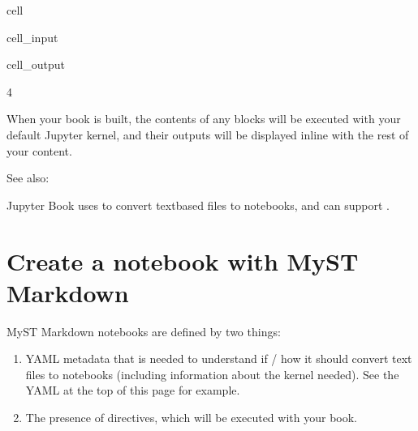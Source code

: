 \documentclass[letterpaper,10pt,english]{jupyterBook}
\begin{document}
\begin{sphinxuseclass}{cell}\begin{sphinxVerbatimInput}

\begin{sphinxuseclass}{cell_input}
\begin{sphinxVerbatim}[commandchars=\\\{\}]
  
\end{sphinxVerbatim}

\end{sphinxuseclass}\end{sphinxVerbatimInput}
\begin{sphinxVerbatimOutput}

\begin{sphinxuseclass}{cell_output}
\begin{sphinxVerbatim}[commandchars=\\\{\}]
4
\end{sphinxVerbatim}

\end{sphinxuseclass}\end{sphinxVerbatimOutput}

\end{sphinxuseclass}
\sphinxAtStartPar
When your book is built, the contents of any  blocks will be
executed with your default Jupyter kernel, and their outputs will be displayed
in\sphinxhyphen{}line with the rest of your content.


\begin{sphinxseealso}{See also:}

\sphinxAtStartPar
Jupyter Book uses  to convert text\sphinxhyphen{}based files to notebooks, and can support .


\end{sphinxseealso}



\section{Create a notebook with MyST Markdown}
\label{\detokenize{markdown-notebooks:create-a-notebook-with-myst-markdown}}
\sphinxAtStartPar
MyST Markdown notebooks are defined by two things:
\begin{enumerate}
%
\item {} 
\sphinxAtStartPar
YAML metadata that is needed to understand if / how it should convert text files to notebooks (including information about the kernel needed).
See the YAML at the top of this page for example.

\item {} 
\sphinxAtStartPar
The presence of  directives, which will be executed with your book.

\end{enumerate}
\end{document}
